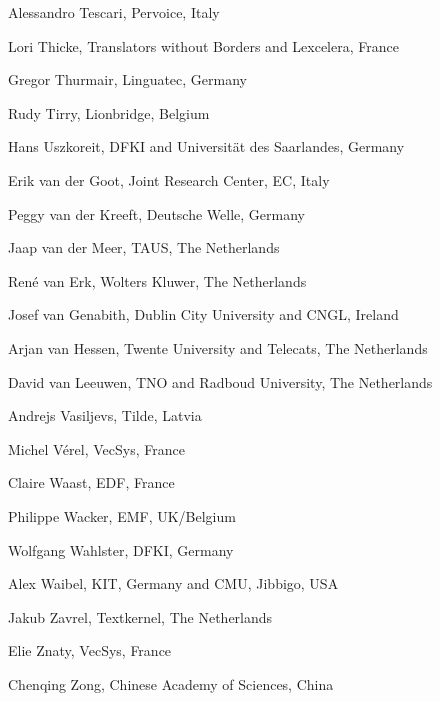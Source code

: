 \documentclass[10pt, plain]{../../metanetpaper}
\begin{document}
\begin{multicols}{3}
\begin{small}
\begin{enumerate}
{      \item Alessandro Tescari, Pervoice, Italy
      \item Lori Thicke, Translators without Borders and Lexcelera, France
      \item Gregor Thurmair, Linguatec, Germany
      \item Rudy Tirry, Lionbridge, Belgium
      \item Hans Uszkoreit, DFKI and Universität des Saarlandes, Germany
      \item Erik van der Goot, Joint Research Center, EC, Italy
      \item Peggy van der Kreeft, Deutsche Welle, Germany
      \item Jaap van der Meer, TAUS, The Netherlands
      \item René van Erk, Wolters Kluwer, The Netherlands
      \item Josef van Genabith, Dublin City University and CNGL, Ireland
      \item Arjan van Hessen, Twente University and Telecats, The Netherlands
      \item David van Leeuwen, TNO and Radboud University, The Netherlands
      \item Andrejs Vasiljevs, Tilde, Latvia
      \item Michel Vérel, VecSys, France
      \item Claire Waast, EDF, France
      \item Philippe Wacker, EMF, UK/Belgium
      \item Wolfgang Wahlster, DFKI, Germany
      \item Alex Waibel, KIT, Germany and CMU, Jibbigo, USA
      \item Jakub Zavrel, Textkernel, The Netherlands
      \item Elie Znaty, VecSys, France
      \item Chenqing Zong, Chinese Academy of Sciences, China
    }
  \end{enumerate}
\end{small}
\end{multicols}
  
\clearpage


\label{sec:app-meta-net}
\end{document}
